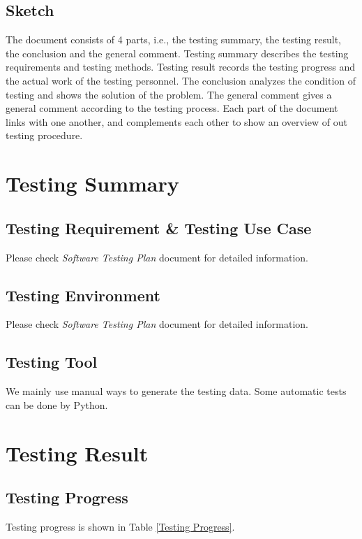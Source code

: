 \documentclass[10pt]{article}
\begin{document}
\subsection{Sketch}
The document consists of 4 parts, i.e., the testing summary, the testing result, the conclusion and the general comment. Testing summary describes the testing requirements and testing methods. Testing result records the testing progress and the actual work of the testing personnel. The conclusion analyzes the condition of testing and shows the solution of the problem. The general comment gives a general comment according to the testing process. Each part of the document links with one another, and complements each other to show an overview of out testing procedure.

\section{Testing Summary}
\subsection{Testing Requirement \& Testing Use Case}
Please check \emph{Software Testing Plan} document for detailed information.

\subsection{Testing Environment}
Please check \emph{Software Testing Plan} document for detailed information.

\subsection{Testing Tool}
We mainly use manual ways to generate the testing data. Some automatic tests can be done by Python.

\section{Testing Result}
\subsection{Testing Progress}
Testing progress is shown in Table \ref{Testing Progress}.
\end{document}
